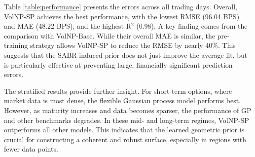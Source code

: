 \documentclass[authoryear,preprint,review,12pt]{elsarticle}
\begin{document}
\begin{table}[ht]
\centering
\caption{Overall and stratified performance comparison. Short-, mid-, and long-term correspond to maturities of 0-3 months, 3-12 months, and >12 months, respectively. RMSE and MAE are in basis points (BPS). Best result in each category is in \textbf{bold}.}
\label{table:performance}
\end{table}

Table \ref{table:performance} presents the errors across all trading days. Overall, VolNP-SP achieves the best performance, with the lowest RMSE (96.04 BPS) and MAE (48.22 BPS), and the highest R$^2$ (0.98). A key finding comes from the comparison with VolNP-Base. While their overall MAE is similar, the pre-training strategy allows VolNP-SP to reduce the RMSE by nearly 40\%. This suggests that the SABR-induced prior does not just improve the average fit, but is particularly effective at preventing large, financially significant prediction errors.

The stratified results provide further insight. For short-term options, where market data is most dense, the flexible Gaussian process model performs best. However, as maturity increases and data becomes sparser, the performance of GP and other benchmarks degrades. In these mid- and long-term regimes, VolNP-SP outperforms all other models. This indicates that the learned geometric prior is crucial for constructing a coherent and robust surface, especially in regions with fewer data points. 
\end{document}
